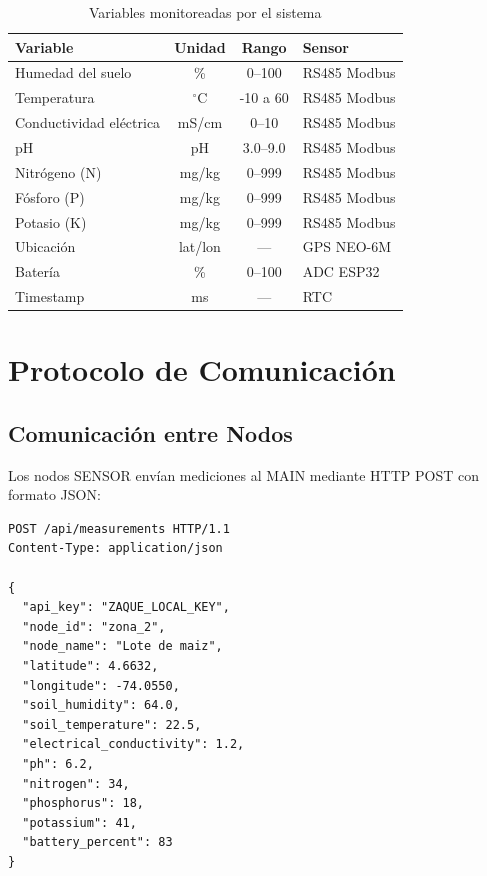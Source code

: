 \documentclass[journal]{IEEEtran}
\begin{document}
\begin{table}[h]
\centering
\caption{Variables monitoreadas por el sistema}
\label{tab:variables}
\scriptsize
\begin{tabularx}{\columnwidth}{|>{\raggedright\arraybackslash}X|
                                  c|
                                  c|
                                  >{\raggedright\arraybackslash}X|}
\hline
\textbf{Variable} & \textbf{Unidad} & \textbf{Rango} & \textbf{Sensor} \\
\hline
Humedad del suelo & \% & 0--100 & RS485 Modbus \\
\hline
Temperatura & $^\circ$C & -10 a 60 & RS485 Modbus \\
\hline
Conductividad eléctrica & mS/cm & 0--10 & RS485 Modbus \\
\hline
pH & pH & 3.0--9.0 & RS485 Modbus \\
\hline
Nitrógeno (N) & mg/kg & 0--999 & RS485 Modbus \\
\hline
Fósforo (P) & mg/kg & 0--999 & RS485 Modbus \\
\hline
Potasio (K) & mg/kg & 0--999 & RS485 Modbus \\
\hline
Ubicación & lat/lon & --- & GPS NEO-6M \\
\hline
Batería & \% & 0--100 & ADC ESP32 \\
\hline
Timestamp & ms & --- & RTC \\
\hline
\end{tabularx}
\end{table}

\section{Protocolo de Comunicación}

\subsection{Comunicación entre Nodos}

Los nodos SENSOR envían mediciones al MAIN mediante HTTP POST con formato JSON:

\begin{lstlisting}
POST /api/measurements HTTP/1.1
Content-Type: application/json

{
  "api_key": "ZAQUE_LOCAL_KEY",
  "node_id": "zona_2",
  "node_name": "Lote de maiz",
  "latitude": 4.6632,
  "longitude": -74.0550,
  "soil_humidity": 64.0,
  "soil_temperature": 22.5,
  "electrical_conductivity": 1.2,
  "ph": 6.2,
  "nitrogen": 34,
  "phosphorus": 18,
  "potassium": 41,
  "battery_percent": 83
}
\end{lstlisting}
\end{document}
